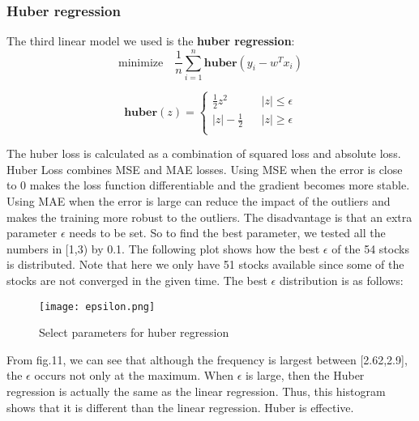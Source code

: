 \documentclass[fleqn,10pt]{SelfArx} %
\begin{document}
\subsubsection{Huber regression}
The third linear model we used is the \textbf{huber regression}:
$$ \text{minimize} \quad \frac{1}{n}\sum_{i=1}^{n} \textbf{huber}(y_i - w^Tx_i)$$

$$
\textbf{huber}(z) = \left\{
\begin{array}{rcl}
\frac{1}{2}z^2 && |z| \le \epsilon \\
|z| - \frac{1}{2} && |z| \ge \epsilon \\ 
\end{array}
\right.
$$

\noindent
The huber loss is calculated as a combination of squared loss and absolute loss. Huber Loss combines MSE and MAE losses. Using MSE when the error is close to 0 makes the loss function differentiable and the gradient becomes more stable. Using MAE when the error is large can reduce the impact of the outliers and makes the training more robust to the outliers. The disadvantage is that an extra parameter $\epsilon$ needs to be set. So to find the best parameter, we tested all the numbers in [1,3) by 0.1. The following plot shows how the best $\epsilon$ of the 54 stocks is distributed. Note that here we only have 51 stocks available since some of the stocks are not converged in the given time. The best $\epsilon$ distribution is as follows:  

\begin{figure}[ht]\centering %
\texttt{[image: epsilon.png]}
\caption{Select parameters for huber regression}
\label{fig:view}
\end{figure}
\noindent
From fig.11, we can see that although the frequency is largest between [2.62,2.9], the $\epsilon$ occurs not only at the maximum. When $\epsilon$ is large, then the Huber regression is actually the same as the linear regression. Thus, this histogram shows that it is different than the linear regression. Huber is effective. \\
\end{document}
